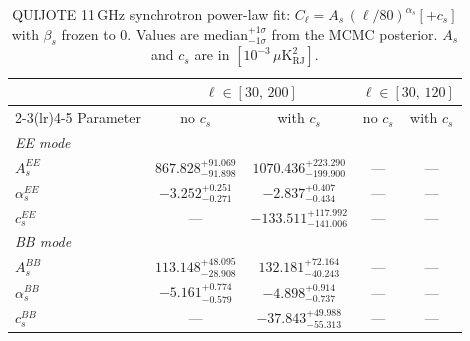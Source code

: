 \begin{table}[htbp]
\centering
\caption{QUIJOTE 11\,GHz synchrotron power-law fit: $C_\ell = A_s\,(\ell/80)^{\alpha_s} [+ c_s]$ with $\beta_s$ frozen to 0. Values are median$^{+1\sigma}_{-1\sigma}$ from the MCMC posterior. $A_s$ and $c_s$ are in $[10^{-3}\,\mu\mathrm{K}^2_\mathrm{RJ}]$.}
\label{tab:sync_11ghz}
\begin{tabular}{lcccc}
\toprule
& \multicolumn{2}{c}{$\ell \in [30,\,200]$} & \multicolumn{2}{c}{$\ell \in [30,\,120]$} \\
\cmidrule(lr){2-3}\cmidrule(lr){4-5}
Parameter & no $c_s$ & with $c_s$ & no $c_s$ & with $c_s$ \\
\midrule
\multicolumn{5}{l}{\textit{EE mode}} \\
$A_s^{EE}$ & $867.828^{+91.069}_{-91.898}$ & $1070.436^{+223.290}_{-199.900}$ & \multicolumn{1}{c}{---} & \multicolumn{1}{c}{---} \\
$\alpha_s^{EE}$ & $-3.252^{+0.251}_{-0.271}$ & $-2.837^{+0.407}_{-0.434}$ & \multicolumn{1}{c}{---} & \multicolumn{1}{c}{---} \\
$c_s^{EE}$ & \multicolumn{1}{c}{---} & $-133.511^{+117.992}_{-141.006}$ & \multicolumn{1}{c}{---} & \multicolumn{1}{c}{---} \\
\midrule
\multicolumn{5}{l}{\textit{BB mode}} \\
$A_s^{BB}$ & $113.148^{+48.095}_{-28.908}$ & $132.181^{+72.164}_{-40.243}$ & \multicolumn{1}{c}{---} & \multicolumn{1}{c}{---} \\
$\alpha_s^{BB}$ & $-5.161^{+0.774}_{-0.579}$ & $-4.898^{+0.914}_{-0.737}$ & \multicolumn{1}{c}{---} & \multicolumn{1}{c}{---} \\
$c_s^{BB}$ & \multicolumn{1}{c}{---} & $-37.843^{+49.988}_{-55.313}$ & \multicolumn{1}{c}{---} & \multicolumn{1}{c}{---} \\
\bottomrule
\end{tabular}
\end{table}